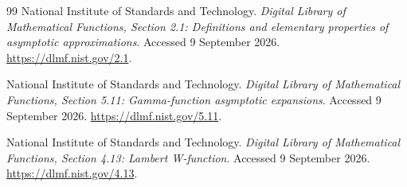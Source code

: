\begin{thebibliography}{99}
National Institute of Standards and Technology. \emph{Digital Library of Mathematical Functions, Section 2.1: Definitions and elementary properties of asymptotic approximations}. Accessed 9 September 2026.
\url{https://dlmf.nist.gov/2.1}.

National Institute of Standards and Technology. \emph{Digital Library of Mathematical Functions, Section 5.11: Gamma-function asymptotic expansions}. Accessed 9 September 2026.
\url{https://dlmf.nist.gov/5.11}.

National Institute of Standards and Technology. \emph{Digital Library of Mathematical Functions, Section 4.13: Lambert W-function}. Accessed 9 September 2026.
\url{https://dlmf.nist.gov/4.13}.
\end{thebibliography}
